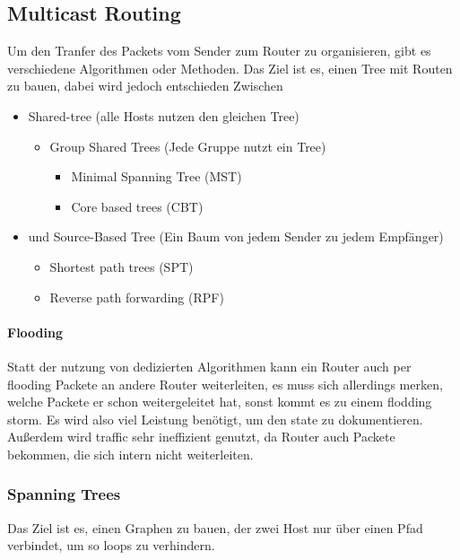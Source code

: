     \subsection{Multicast Routing}
        Um den Tranfer des Packets vom Sender zum Router zu organisieren, gibt es verschiedene Algorithmen oder Methoden. Das Ziel ist es, einen Tree mit Routen zu bauen, dabei wird jedoch entschieden Zwischen 
        \begin{itemize}
            \item Shared-tree (alle Hosts nutzen den gleichen Tree)
                \begin{itemize}
                    \item Group Shared Trees (Jede Gruppe nutzt ein Tree)
                        \begin{itemize}
                            \item Minimal Spanning Tree (MST)
                            \item Core based trees (CBT)
                        \end{itemize}
                \end{itemize}
            \item und Source-Based Tree (Ein Baum von jedem Sender zu jedem Empfänger)
                \begin{itemize}
                    \item Shortest path trees (SPT)
                    \item Reverse path forwarding (RPF)
                \end{itemize}
        \end{itemize}

        \paragraph{Flooding}
            Statt der nutzung von dedizierten Algorithmen kann ein Router auch per flooding Packete an andere Router weiterleiten, es muss sich allerdings merken, welche Packete er schon weitergeleitet hat, sonst kommt es zu einem flodding storm. Es wird also viel Leistung benötigt, um den state zu dokumentieren. Außerdem wird traffic sehr ineffizient genutzt, da Router auch Packete bekommen, die sich intern nicht weiterleiten. 
        
        \subsubsection{Spanning Trees}
            Das Ziel ist es, einen Graphen zu bauen, der zwei Host nur über einen Pfad verbindet, um so loops zu verhindern. 

